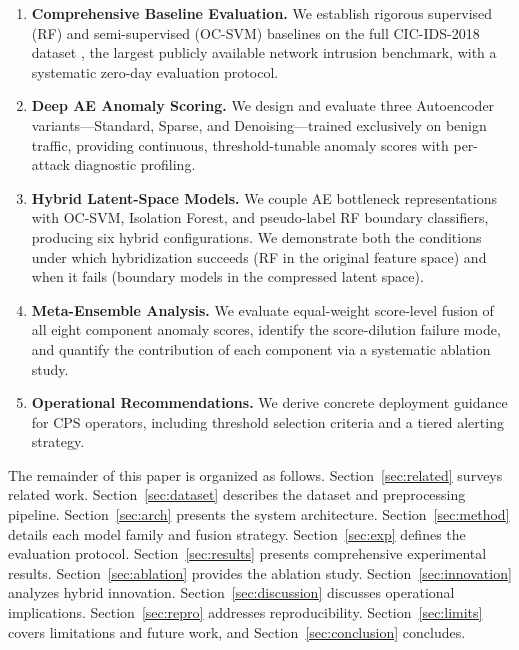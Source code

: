 \documentclass[10pt,journal,compsoc]{IEEEtran}
\begin{document}
\begin{enumerate}[leftmargin=*,noitemsep,topsep=2pt]
  \item \textbf{Comprehensive Baseline Evaluation.}  We establish
    rigorous supervised (RF) and semi-supervised (OC-SVM) baselines
    on the full CIC-IDS-2018 dataset \cite{sharafaldin2018}, the
    largest publicly available network intrusion benchmark, with a
    systematic zero-day evaluation protocol.
  \item \textbf{Deep AE Anomaly Scoring.}  We design and evaluate
    three Autoencoder variants---Standard, Sparse, and
    Denoising---trained exclusively on benign traffic, providing
    continuous, threshold-tunable anomaly scores with per-attack
    diagnostic profiling.
  \item \textbf{Hybrid Latent-Space Models.}  We couple AE bottleneck
    representations with OC-SVM, Isolation Forest, and pseudo-label RF
    boundary classifiers, producing six hybrid configurations.  We
    demonstrate both the conditions under which hybridization succeeds
    (RF in the original feature space) and when it fails (boundary
    models in the compressed latent space).
  \item \textbf{Meta-Ensemble Analysis.}  We evaluate equal-weight
    score-level fusion of all eight component anomaly scores, identify
    the score-dilution failure mode, and quantify the contribution of
    each component via a systematic ablation study.
  \item \textbf{Operational Recommendations.}  We derive concrete
    deployment guidance for CPS operators, including threshold
    selection criteria and a tiered alerting strategy.
\end{enumerate}

The remainder of this paper is organized as follows.
Section~\ref{sec:related} surveys related work.
Section~\ref{sec:dataset} describes the dataset and preprocessing
pipeline.  Section~\ref{sec:arch} presents the system architecture.
Section~\ref{sec:method} details each model family and fusion
strategy.  Section~\ref{sec:exp} defines the evaluation protocol.
Section~\ref{sec:results} presents comprehensive experimental results.
Section~\ref{sec:ablation} provides the ablation study.
Section~\ref{sec:innovation} analyzes hybrid innovation.
Section~\ref{sec:discussion} discusses operational implications.
Section~\ref{sec:repro} addresses reproducibility.
Section~\ref{sec:limits} covers limitations and future work, and
Section~\ref{sec:conclusion} concludes.
\end{document}
